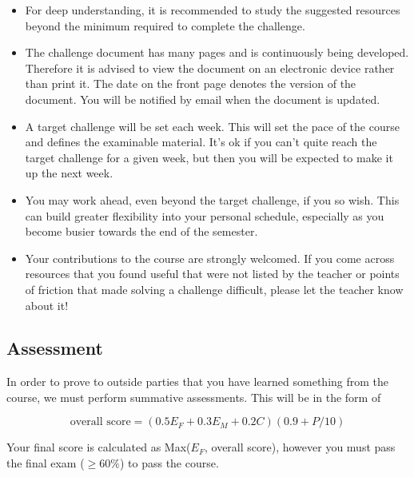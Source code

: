 \begin{itemize}
    \item For deep understanding, it is recommended to study the suggested resources beyond the minimum required to complete the challenge.
    \item The challenge document has many pages and is continuously being developed. Therefore it is advised to view the document on an electronic device rather than print it. The date on the front page denotes the version of the document. You will be notified by email when the document is updated.
    \item A target challenge will be set each week. This will set the pace of the course and defines the examinable material. It's ok if you can't quite reach the target challenge for a given week, but then you will be expected to make it up the next week.
    \item You may work ahead, even beyond the target challenge, if you so wish. This can build greater flexibility into your personal schedule, especially as you become busier towards the end of the semester.
    \item Your contributions to the course are strongly welcomed. If you come across resources that you found useful that were not listed by the teacher or points of friction that made solving a challenge difficult, please let the teacher know about it!
\end{itemize}

\subsection{Assessment}
In order to prove to outside parties that you have learned something from the course, we must perform summative assessments. This will be in the form of

\begin{equation*}
    \text{overall score} = (0.5 E_F + 0.3 E_M + 0.2 C) (0.9 + P/10)
\end{equation*}

Your final score is calculated as Max($E_F$, overall score), however you must pass the final exam ($\ge 60\%$) to pass the course.

